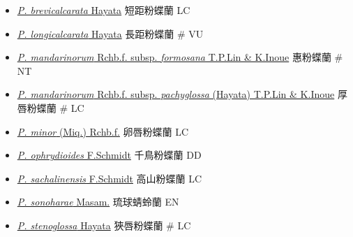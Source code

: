 \begin{itemize}
  \begin{itemize}
        \item[] \href{http://www.theplantlist.org/tpl1.1/search?q=Platanthera+brevicalcarata}{\textit{P. brevicalcarata} Hayata}   短距粉蝶蘭   LC
        \item[] \href{http://www.theplantlist.org/tpl1.1/search?q=Platanthera+longicalcarata}{\textit{P. longicalcarata} Hayata}   長距粉蝶蘭  \# VU
        \item[] \href{http://www.theplantlist.org/tpl1.1/search?q=Platanthera+mandarinorum+subsp.+formosana}{\textit{P. mandarinorum} Rchb.f. subsp. \textit{formosana} T.P.Lin \& K.Inoue}   惠粉蝶蘭  \# NT
        \item[] \href{http://www.theplantlist.org/tpl1.1/search?q=Platanthera+mandarinorum+subsp.+pachyglossa}{\textit{P. mandarinorum} Rchb.f. subsp. \textit{pachyglossa} (Hayata) T.P.Lin \& K.Inoue}   厚唇粉蝶蘭  \# LC
        \item[] \href{http://www.theplantlist.org/tpl1.1/search?q=Platanthera+minor}{\textit{P. minor} (Miq.) Rchb.f.}   卵唇粉蝶蘭   LC
        \item[] \href{http://www.theplantlist.org/tpl1.1/search?q=Platanthera+ophrydioides}{\textit{P. ophrydioides} F.Schmidt}   千鳥粉蝶蘭   DD
        \item[] \href{http://www.theplantlist.org/tpl1.1/search?q=Platanthera+sachalinensis}{\textit{P. sachalinensis} F.Schmidt}   高山粉蝶蘭   LC
        \item[] \href{http://www.theplantlist.org/tpl1.1/search?q=Platanthera+sonoharae}{\textit{P. sonoharae} Masam.}   琉球蜻蛉蘭   EN
        \item[] \href{http://www.theplantlist.org/tpl1.1/search?q=Platanthera+stenoglossa}{\textit{P. stenoglossa} Hayata}   狹唇粉蝶蘭  \# LC

\end{itemize}
\end{itemize}
